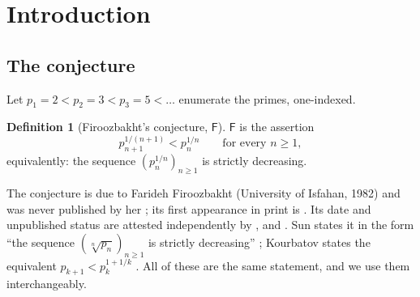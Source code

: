 \documentclass[11pt,a4paper]{article}
\theoremstyle{plain}
\theoremstyle{definition}
\newtheorem{definition}[theorem]{Definition}
\theoremstyle{remark}
\newcommand{\Fb}{\mathsf{F}}
\begin{document}
\begin{abstract}
envelope of power type at any positive exponent certifies it beyond finitely many indices, the
critical constant on the $\sqrt{p}\log p$ scale is exactly $2/e$, and Cram\'er's $\limsup$
hypothesis does not entail the conjecture over integer sequences. (v) An exhaustive sweep to
$10^{11}$ ($4\,118\,054\,812$ consecutive prime pairs) finds no violation and no near-miss, with
$\max_{n \ge 10} g_n/T_n = 0.8318$; five further independent sweeps across rounds~2 and~3
reproduce it. We also state, at length, what the attack did \emph{not} establish: the
conjecture is open; the underlying corpus's evidence gate stands at \textbf{BLOCKED} --- round~3
closed all three of round~2's unreconciled seams and returned two bookkeeping defects of its own,
neither mathematical and neither touching the conjecture; a round-2 citation audit of this paper's predecessor exists and returned
\textbf{PASS}, but it predates the round-3 decisions and does not clear the two load-bearing
sources that remain unopened, so \emph{no citation clearance is claimed here}.
\end{abstract}

\tableofcontents

\section{Introduction}
\label{sec:intro}

\subsection{The conjecture}

Let $p_1 = 2 < p_2 = 3 < p_3 = 5 < \dots$ enumerate the primes, one-indexed.

\begin{definition}[Firoozbakht's conjecture, $\Fb$]
\label{def:F}
$\Fb$ is the assertion
\begin{equation}
\label{eq:F}
p_{n+1}^{1/(n+1)} < p_n^{1/n} \qquad \text{for every } n \ge 1,
\end{equation}
equivalently: the sequence $\left(p_n^{1/n}\right)_{n \ge 1}$ is strictly decreasing.
\end{definition}

The conjecture is due to Farideh Firoozbakht (University of Isfahan, 1982) and was never
published by her \cite{firoozbakht1982unpublished}; its first appearance in print is
\cite[p.~185]{ribenboim2004little}. Its date and unpublished status are attested
independently by \cite[\S1]{kourbatov2015bounds}, \cite[\S1]{ferreira2017consequences} and
\cite{visser2019verifying}. Sun states it in the form ``the sequence $(\sqrt[n]{p_n})_{n\ge1}$
is strictly decreasing'' \cite[\S1]{sun2013sequence}; Kourbatov states the equivalent
$p_{k+1} < p_k^{1+1/k}$ \cite[\S1, eq.~(1)]{kourbatov2015bounds}. All of these are the same
statement, and we use them interchangeably.
\end{document}
